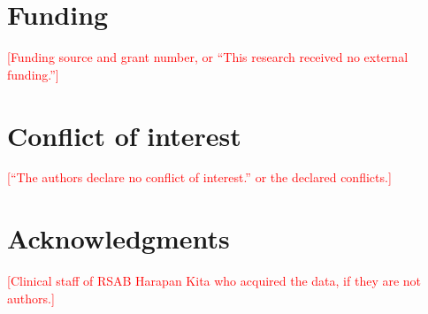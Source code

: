 \documentclass{article}
\newcommand{\pending}[1]{\textcolor{red}{[#1]}}
\begin{document}
\section*{Funding}
\pending{Funding source and grant number, or ``This research received no external funding.''}

\section*{Conflict of interest}
\pending{``The authors declare no conflict of interest.'' or the declared conflicts.}

\section*{Acknowledgments}
\pending{Clinical staff of RSAB Harapan Kita who acquired the data, if they are not authors.}

\clearpage
\printbibliography
\end{document}
